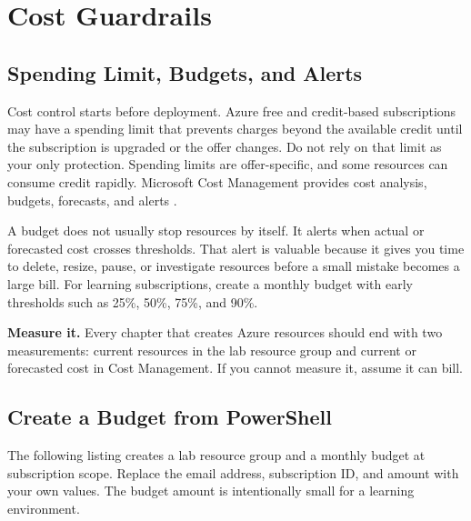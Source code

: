\section{Cost Guardrails}

\subsection{Spending Limit, Budgets, and Alerts}
Cost control starts before deployment. Azure free and credit-based subscriptions may have a spending limit that prevents charges beyond the available credit until the subscription is upgraded or the offer changes. Do not rely on that limit as your only protection. Spending limits are offer-specific, and some resources can consume credit rapidly. Microsoft Cost Management provides cost analysis, budgets, forecasts, and alerts \cite{microsoft2025costBudgets}.

A budget does not usually stop resources by itself. It alerts when actual or forecasted cost crosses thresholds. That alert is valuable because it gives you time to delete, resize, pause, or investigate resources before a small mistake becomes a large bill. For learning subscriptions, create a monthly budget with early thresholds such as 25\%, 50\%, 75\%, and 90\%.

\begin{tipbox}
\textbf{Measure it.} Every chapter that creates Azure resources should end with two measurements: current resources in the lab resource group and current or forecasted cost in Cost Management. If you cannot measure it, assume it can bill.
\end{tipbox}

\subsection{Create a Budget from PowerShell}
The following listing creates a lab resource group and a monthly budget at subscription scope. Replace the email address, subscription ID, and amount with your own values. The budget amount is intentionally small for a learning environment.

